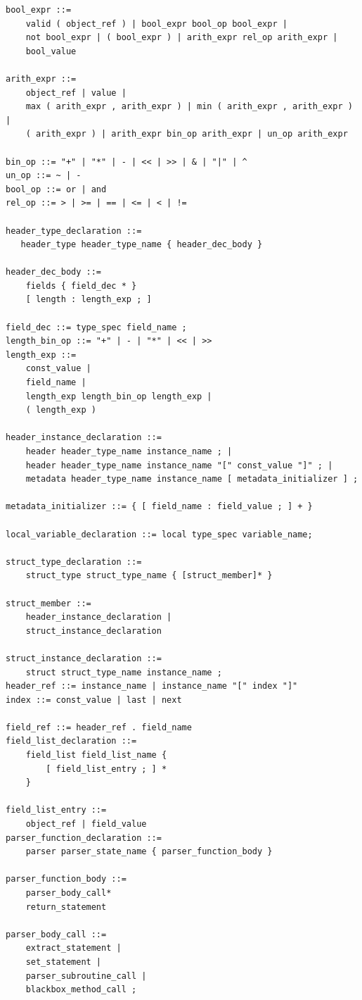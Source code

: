 \documentclass[12pt]{article}
\begin{document}
\begin{lstlisting}[style=BNFstyle]
bool_expr ::=
    valid ( object_ref ) | bool_expr bool_op bool_expr |
    not bool_expr | ( bool_expr ) | arith_expr rel_op arith_expr |
    bool_value

arith_expr ::=
    object_ref | value | 
    max ( arith_expr , arith_expr ) | min ( arith_expr , arith_expr ) |
    ( arith_expr ) | arith_expr bin_op arith_expr | un_op arith_expr

bin_op ::= "+" | "*" | - | << | >> | & | "|" | ^
un_op ::= ~ | -
bool_op ::= or | and
rel_op ::= > | >= | == | <= | < | !=

header_type_declaration ::= 
   header_type header_type_name { header_dec_body }

header_dec_body ::=
    fields { field_dec * }
    [ length : length_exp ; ]

field_dec ::= type_spec field_name ;
length_bin_op ::= "+" | - | "*" | << | >>
length_exp ::=
    const_value |
    field_name |
    length_exp length_bin_op length_exp |
    ( length_exp )

header_instance_declaration ::=
    header header_type_name instance_name ; |
    header header_type_name instance_name "[" const_value "]" ; |
    metadata header_type_name instance_name [ metadata_initializer ] ;

metadata_initializer ::= { [ field_name : field_value ; ] + }

local_variable_declaration ::= local type_spec variable_name;

struct_type_declaration ::=
    struct_type struct_type_name { [struct_member]* }

struct_member ::=
    header_instance_declaration |
    struct_instance_declaration

struct_instance_declaration ::=
    struct struct_type_name instance_name ;
header_ref ::= instance_name | instance_name "[" index "]"
index ::= const_value | last | next

field_ref ::= header_ref . field_name
field_list_declaration ::=
    field_list field_list_name {
        [ field_list_entry ; ] *
    }

field_list_entry ::= 
    object_ref | field_value
parser_function_declaration ::=
    parser parser_state_name { parser_function_body }

parser_function_body ::=
    parser_body_call*
    return_statement

parser_body_call ::= 
    extract_statement |
    set_statement |
    parser_subroutine_call |
    blackbox_method_call ;


\end{lstlisting}
\end{document}
